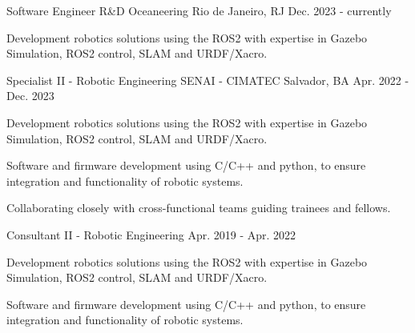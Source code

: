 

\begin{cventries}

\cventry
  {Software Engineer R\&D} %
  {Oceaneering} %
  {Rio de Janeiro, RJ} %
  {Dec. 2023 - currently} %
  {
    \begin{cvitems} %
      \item {Development robotics solutions using the ROS2 with expertise in Gazebo Simulation, ROS2 control, SLAM and URDF/Xacro.}
    \end{cvitems}
  }

\cventry
  {Specialist II - Robotic Engineering} %
  {SENAI - CIMATEC} %
  {Salvador, BA} %
  {Apr. 2022 - Dec. 2023} %
  {
    \begin{cvitems} %
      \item {Development robotics solutions using the ROS2 with expertise in Gazebo Simulation, ROS2 control, SLAM and URDF/Xacro.}
      \item {Software and firmware development using C/C++ and python, to ensure integration and functionality of robotic systems.}
      \item {Collaborating closely with cross-functional teams guiding trainees and fellows.}
    \end{cvitems}
  }

\cventry
  {Consultant II - Robotic Engineering} %
  {} %
  {} %
  {Apr. 2019 - Apr. 2022} %
  {
    \begin{cvitems} %
      \item {Development robotics solutions using the ROS2 with expertise in Gazebo Simulation, ROS2 control, SLAM and URDF/Xacro.}
      \item {Software and firmware development using C/C++ and python, to ensure integration and functionality of robotic systems.}
    \end{cvitems}
  }


\end{cventries}
